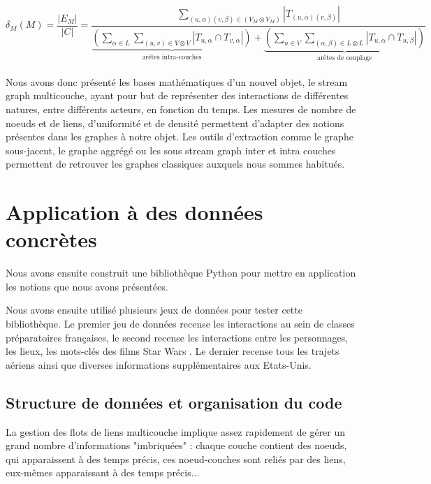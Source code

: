 \documentclass[11pt,a4paper]{article}
\theoremstyle{definition}
\theoremstyle{remark}
\theoremstyle{remark}
\def \stg {stream graph}
\def \stgm {stream graph multicouche}
\begin{document}
	\[
		\delta_M (M) = 
		\frac{|E_M|}{|C|}= 
		\frac{\sum_{(u,\alpha)(v,\beta) \in (V_M \otimes V_M)} |T_{(u,\alpha)(v,\beta)}|}
		{\underbrace{(\sum_{\alpha \in L}\sum_{(u,v) \in V\otimes V}|T_{u,\alpha} \cap T_{v,\alpha}|)}_{\text{arêtes intra-couches}}+\underbrace{( \sum_{u \in V } \sum_{(\alpha,\beta) \in L \otimes L}|T_{u,\alpha}\cap T_{u,\beta}|)}_{\text{arêtes de couplage}}}
	\]


\paragraph{}
Nous avons donc présenté les bases mathématiques d'un nouvel objet, le \stgm{}, ayant pour but de représenter des interactions de différentes natures, entre différents acteurs, en fonction du temps. Les mesures de nombre de noeuds et de liens, d'uniformité et de densité permettent d'adapter des notions présentes dans les graphes à notre objet. Les outils d'extraction comme le graphe sous-jacent, le graphe aggrégé ou les sous \stg{} inter et intra couches permettent de \og retrouver \fg{} les graphes classiques auxquels nous sommes habitués.
	
\section{Application à des données concrètes}


Nous avons ensuite construit une bibliothèque Python \cite{github} pour mettre en application les notions que nous avons présentées.

Nous avons ensuite utilisé plusieurs jeux de données pour tester cette bibliothèque. Le premier jeu de données recense les interactions au sein de classes préparatoires françaises, le second recense les interactions entre les personnages, les lieux, les mots-clés des films \og Star Wars \fg{}. Le dernier recense tous les trajets aériens ainsi que diverses informations supplémentaires aux Etats-Unis.

\subsection{Structure de données et organisation du code} 
\label{descode}

	La gestion des flots de liens multicouche implique assez rapidement de gérer un grand nombre d'informations "imbriquées" : chaque couche contient des noeuds, qui apparaissent à des temps précis, ces noeud-couches sont reliés par des liens, eux-mêmes apparaissant à des temps précis...
	
\end{document}
